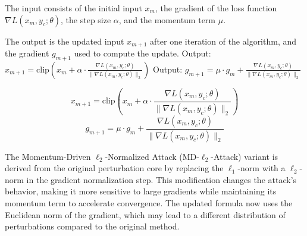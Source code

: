 The input consists of the initial input $x_m$, the gradient of the loss function $\nabla L(x_m, y_c; \theta)$, the step size $\alpha$, and the momentum term $\mu$.

The output is the updated input $x_{m+1}$ after one iteration of the algorithm, and the gradient $g_{m+1}$ used to compute the update.
Output: $x_{m+1} = \text{clip} \left( x_m + \alpha \cdot \frac{\nabla L(x_m, y_c; \theta)}{\|\nabla L(x_m, y_c; \theta)\|_2} \right)$
Output: $g_{m+1} = \mu \cdot g_m + \frac{\nabla L(x_m, y_c; \theta)}{\|\nabla L(x_m, y_c; \theta)\|_2}$

\[
x_{m+1} = \text{clip} \left( x_m + \alpha \cdot \frac{\nabla L(x_m, y_c; \theta)}{\|\nabla L(x_m, y_c; \theta)\|_2} \right)
\]
\[
g_{m+1} = \mu \cdot g_m + \frac{\nabla L(x_m, y_c; \theta)}{\|\nabla L(x_m, y_c; \theta)\|_2}
\]


The Momentum-Driven $\ell_2$-Normalized Attack (MD-$\ell_2$-Attack) variant is derived from the original perturbation core by replacing the $\ell_1$-norm with a $\ell_2$-norm in the gradient normalization step. This modification changes the attack's behavior, making it more sensitive to large gradients while maintaining its momentum term to accelerate convergence. The updated formula now uses the Euclidean norm of the gradient, which may lead to a different distribution of perturbations compared to the original method.
